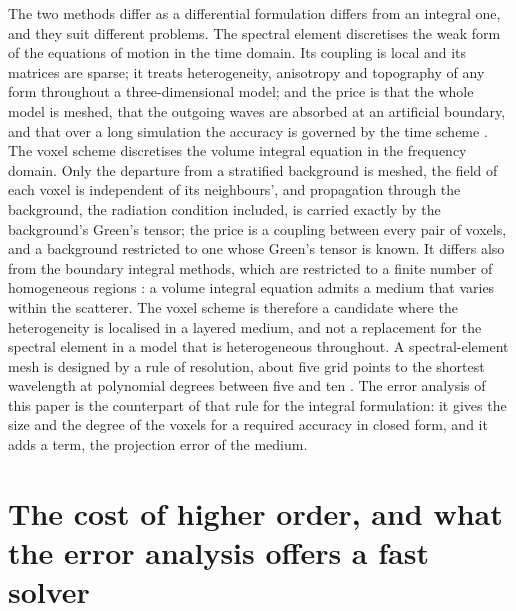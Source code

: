 \documentclass[11pt,a4paper]{article}
\begin{document}
The two methods differ as a differential formulation differs from an integral one, and they suit
different problems. The spectral element discretises the weak form of the equations of motion in the
time domain. Its coupling is local and its matrices are sparse; it treats heterogeneity, anisotropy
and topography of any form throughout a three-dimensional model; and the price is that the whole
model is meshed, that the outgoing waves are absorbed at an artificial boundary, and that over a long
simulation the accuracy is governed by the time scheme \citep{Komatitsch1999}. The voxel scheme
discretises the volume integral equation in the frequency domain. Only the departure from a stratified
background is meshed, the field of each voxel is independent of its neighbours', and propagation
through the background, the radiation condition included, is carried exactly by the background's
Green's tensor; the price is a coupling between every pair of voxels, and a background restricted to
one whose Green's tensor is known. It differs also from the boundary integral methods, which are
restricted to a finite number of homogeneous regions \citep{Komatitsch1999}: a volume integral
equation admits a medium that varies within the scatterer. The voxel scheme is therefore a candidate
where the heterogeneity is localised in a layered medium, and not a replacement for the spectral element
in a model that is heterogeneous throughout. A spectral-element mesh is designed by a rule of
resolution, about five grid points to the shortest wavelength at polynomial degrees between five and
ten \citep{Komatitsch1999}. The error analysis of this paper is the counterpart of that rule for the
integral formulation: it gives the size and the degree of the voxels for a required accuracy in closed
form, and it adds a term, the projection error of the medium.

\FloatBarrier

\section{The cost of higher order, and what the error analysis offers a fast solver}\label{app:cost}
\end{document}
